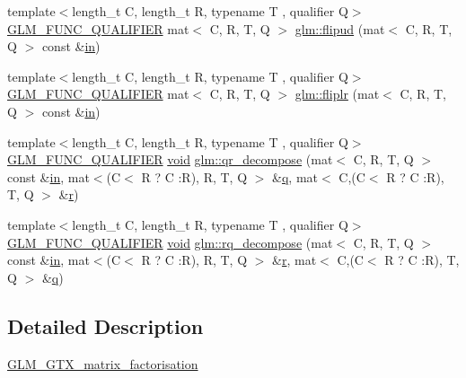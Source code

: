\begin{DoxyCompactItemize}
\item 
{\footnotesize template$<$length\+\_\+t C, length\+\_\+t R, typename T , qualifier Q$>$ }\\\hyperlink{setup_8hpp_a33fdea6f91c5f834105f7415e2a64407}{G\+L\+M\+\_\+\+F\+U\+N\+C\+\_\+\+Q\+U\+A\+L\+I\+F\+I\+ER} mat$<$ C, R, T, Q $>$ \hyperlink{group__gtx__matrix__factorisation_ga85003371f0ba97380dd25e8905de1870}{glm\+::flipud} (mat$<$ C, R, T, Q $>$ const \&\hyperlink{_s_d_l__opengl__glext_8h_a83ad0ee7f1e06b59c90271716e689080}{in})
\item 
{\footnotesize template$<$length\+\_\+t C, length\+\_\+t R, typename T , qualifier Q$>$ }\\\hyperlink{setup_8hpp_a33fdea6f91c5f834105f7415e2a64407}{G\+L\+M\+\_\+\+F\+U\+N\+C\+\_\+\+Q\+U\+A\+L\+I\+F\+I\+ER} mat$<$ C, R, T, Q $>$ \hyperlink{group__gtx__matrix__factorisation_gaf39f4e5f78eb29c1a90277d45b9b3feb}{glm\+::fliplr} (mat$<$ C, R, T, Q $>$ const \&\hyperlink{_s_d_l__opengl__glext_8h_a83ad0ee7f1e06b59c90271716e689080}{in})
\item 
{\footnotesize template$<$length\+\_\+t C, length\+\_\+t R, typename T , qualifier Q$>$ }\\\hyperlink{setup_8hpp_a33fdea6f91c5f834105f7415e2a64407}{G\+L\+M\+\_\+\+F\+U\+N\+C\+\_\+\+Q\+U\+A\+L\+I\+F\+I\+ER} \hyperlink{_s_d_l__opengles2__gl2ext_8h_ae5d8fa23ad07c48bb609509eae494c95}{void} \hyperlink{group__gtx__matrix__factorisation_ga77022dca1aa38add548f9f56a9f8071a}{glm\+::qr\+\_\+decompose} (mat$<$ C, R, T, Q $>$ const \&\hyperlink{_s_d_l__opengl__glext_8h_a83ad0ee7f1e06b59c90271716e689080}{in}, mat$<$(C$<$ R ? C \+:R), R, T, Q $>$ \&\hyperlink{_s_d_l__opengl_8h_a8fc1e7b9baaae687804c7eed46ca09c6}{q}, mat$<$ C,(C$<$ R ? C \+:R), T, Q $>$ \&\hyperlink{_s_d_l__opengl_8h_a42ce7cdc612e53abee15043f80220d97}{r})
\item 
{\footnotesize template$<$length\+\_\+t C, length\+\_\+t R, typename T , qualifier Q$>$ }\\\hyperlink{setup_8hpp_a33fdea6f91c5f834105f7415e2a64407}{G\+L\+M\+\_\+\+F\+U\+N\+C\+\_\+\+Q\+U\+A\+L\+I\+F\+I\+ER} \hyperlink{_s_d_l__opengles2__gl2ext_8h_ae5d8fa23ad07c48bb609509eae494c95}{void} \hyperlink{group__gtx__matrix__factorisation_ga4e022709c9e7eaad9d7cc315d2cdb05c}{glm\+::rq\+\_\+decompose} (mat$<$ C, R, T, Q $>$ const \&\hyperlink{_s_d_l__opengl__glext_8h_a83ad0ee7f1e06b59c90271716e689080}{in}, mat$<$(C$<$ R ? C \+:R), R, T, Q $>$ \&\hyperlink{_s_d_l__opengl_8h_a42ce7cdc612e53abee15043f80220d97}{r}, mat$<$ C,(C$<$ R ? C \+:R), T, Q $>$ \&\hyperlink{_s_d_l__opengl_8h_a8fc1e7b9baaae687804c7eed46ca09c6}{q})
\end{DoxyCompactItemize}


\subsection{Detailed Description}
\hyperlink{group__gtx__matrix__factorisation}{G\+L\+M\+\_\+\+G\+T\+X\+\_\+matrix\+\_\+factorisation} 